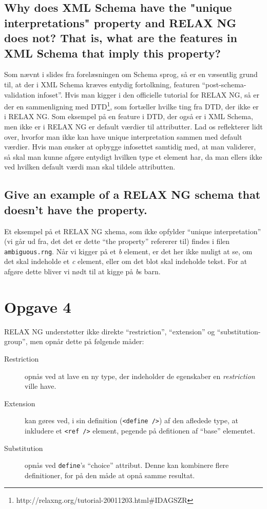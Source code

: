 \documentclass[a4paper,10pt]{article}
\begin{document}
\subsection*{Why does XML Schema have the "unique interpretations" property and RELAX NG does not? That is, what are the features in XML Schema that imply this property?} 
Som nævnt i slides fra forelæsningen om Schema sprog, så er en væsentlig grund til, at der i XML Schema kræves entydig fortolkning, featuren ``post-schema-validation infoset''. Hvis man kigger i den officielle tutorial for RELAX NG, så er der en sammenligning med DTD\footnote{http://relaxng.org/tutorial-20011203.html#IDAGSZR}, som fortæller hvilke ting fra DTD, der ikke er i RELAX NG. Som eksempel på en feature i DTD, der også er i XML Schema, men ikke er i RELAX NG er default værdier til attributter. Lad os reflekterer lidt over, hvorfor  man ikke kan have unique interpretation sammen med default værdier. Hvis man ønsker at opbygge infosettet samtidig med, at man validerer, så skal man kunne afgøre entydigt hvilken type et element har, da man ellers ikke ved hvilken default værdi man skal tildele attributten.

\subsection*{Give an example of a RELAX NG schema that doesn't have the property.}
Et eksempel på et RELAX NG xhema, som ikke opfylder ``unique interpretation'' (vi går ud fra, det det er dette ``the property'' refererer til) findes i filen \texttt{ambiguous.rng}. Når vi kigger på et \emph{b} element, er det her ikke muligt at se, om det skal indeholde et \emph{c} element, eller om det blot skal indeholde tekst. For at afgøre dette bliver vi nødt til at kigge på \emph{b}s barn.

\section*{Opgave 4}
RELAX NG understøtter ikke direkte ``restriction'', ``extension'' og ``substitution-group'', men opnår dette på følgende måder:
\begin{description}
\item[Restriction] opnås ved at lave en ny type, der indeholder de egenskaber en \textit{restriction} ville have. 
\item[Extension] kan gøres ved, i sin definition (\texttt{<define />}) af den afledede type, at inkludere et \texttt{<ref />} element, pegende på defitionen af ``base'' elementet. 
\item[Substitution] opnås ved \texttt{define}'s ``choice'' attribut. Denne kan kombinere flere definitioner, for på den måde at opnå samme resultat.  
\end{description}
\end{document}

